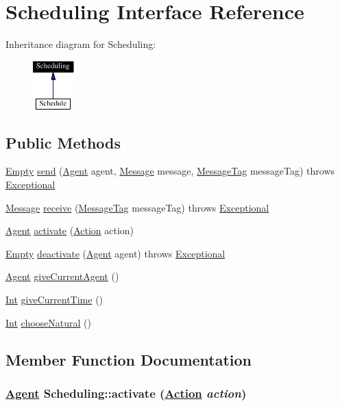 \hypertarget{interfaceScheduling}{
\section{Scheduling  Interface Reference}
\label{interfaceScheduling}
}
Inheritance diagram for Scheduling:\begin{figure}[H]
\begin{center}
\leavevmode
\includegraphics[width=45pt]{interfaceScheduling__inherit__graph}
\end{center}
\end{figure}
\subsection*{Public Methods}
\begin{CompactItemize}
\item 
\hyperlink{interfaceEmpty}{Empty} \hyperlink{interfaceScheduling_a0}{send} (\hyperlink{interfaceAgent}{Agent} agent, \hyperlink{interfaceMessage}{Message} message, \hyperlink{interfaceMessageTag}{Message\-Tag} message\-Tag) throws \hyperlink{classExceptional}{Exceptional}
\item 
\hyperlink{interfaceMessage}{Message} \hyperlink{interfaceScheduling_a1}{receive} (\hyperlink{interfaceMessageTag}{Message\-Tag} message\-Tag) throws \hyperlink{classExceptional}{Exceptional}
\item 
\hyperlink{interfaceAgent}{Agent} \hyperlink{interfaceScheduling_a2}{activate} (\hyperlink{interfaceAction}{Action} action)
\item 
\hyperlink{interfaceEmpty}{Empty} \hyperlink{interfaceScheduling_a3}{deactivate} (\hyperlink{interfaceAgent}{Agent} agent) throws \hyperlink{classExceptional}{Exceptional}
\item 
\hyperlink{interfaceAgent}{Agent} \hyperlink{interfaceScheduling_a4}{give\-Current\-Agent} ()
\item 
\hyperlink{interfaceInt}{Int} \hyperlink{interfaceScheduling_a5}{give\-Current\-Time} ()
\item 
\hyperlink{interfaceInt}{Int} \hyperlink{interfaceScheduling_a6}{choose\-Natural} ()
\end{CompactItemize}


\subsection{Member Function Documentation}
\hypertarget{interfaceScheduling_a2}{
\subsubsection[activate]{\setlength{\rightskip}{0pt plus 5cm}\hyperlink{interfaceAgent}{Agent} Scheduling::activate (\hyperlink{interfaceAction}{Action} {\em action})}}
\label{interfaceScheduling_a2}




